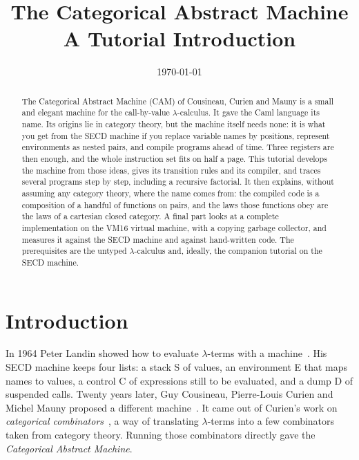 \documentclass[11pt,a4paper]{article}
\title{The Categorical Abstract Machine\\[4pt]\large A Tutorial Introduction}
\author{}
\date{\today}
\theoremstyle{definition}
\theoremstyle{plain}
\begin{document}
\maketitle

\begin{abstract}
\noindent
The Categorical Abstract Machine (CAM) of Cousineau, Curien and Mauny is a
small and elegant machine for the call-by-value $\lambda$-calculus. It gave the
Caml language its name. Its origins lie in category theory, but the machine
itself needs none: it is what you get from the SECD machine if you replace
variable names by positions, represent environments as nested pairs, and
compile programs ahead of time. Three registers are then enough, and the
whole instruction set fits on half a page. This tutorial develops the machine
from those ideas, gives its transition rules and its compiler, and traces
several programs step by step, including a recursive factorial. It then
explains, without assuming any category theory, where the name comes from:
the compiled code is a composition of a handful of functions on pairs, and the
laws those functions obey are the laws of a cartesian closed category. A final
part looks at a complete implementation on the VM16 virtual machine, with a
copying garbage collector, and measures it against the SECD machine and against
hand-written code. The prerequisites are the untyped $\lambda$-calculus and,
ideally, the companion tutorial on the SECD machine.
\end{abstract}

\tableofcontents

\section{Introduction}

In 1964 Peter Landin showed how to evaluate $\lambda$-terms with a
machine~\cite{landin64}. His SECD machine keeps four lists: a stack S of
values, an environment E that maps names to values, a control C of
expressions still to be evaluated, and a dump D of suspended calls. Twenty
years later, Guy Cousineau, Pierre-Louis Curien and Michel Mauny proposed a
different machine~\cite{cam85,cam87}. It came out of Curien's work on
\emph{categorical combinators}~\cite{curien86}, a way of translating
$\lambda$-terms into a few combinators taken from category theory. Running
those combinators directly gave the \emph{Categorical Abstract Machine}.
\end{document}
